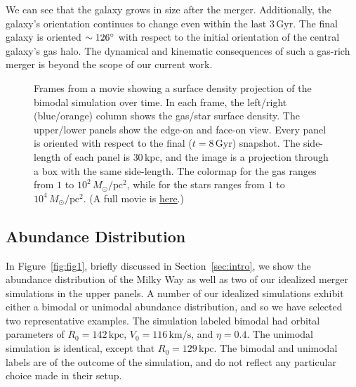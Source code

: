 \documentclass[twocolumn,linenumbers,trackchanges]{aastex631}
\newcommand{\Msun}{\ensuremath{M_{\odot}}}
\newcommand{\Gyr}{\ensuremath{\textrm{Gyr}}}
\newcommand{\kpc}{\ensuremath{\textrm{kpc}}}
\newcommand{\pc}{\ensuremath{\textrm{pc}}}
\newcommand{\kms}{\ensuremath{\textrm{km}/\textrm{s}}}
\begin{document}
We can see that the galaxy grows in size after the merger. Additionally, the galaxy's orientation continues to change even within the last $3\,\Gyr$. The final galaxy is oriented $\sim126\degree$ with respect to the initial orientation of the central galaxy's gas halo. The dynamical and kinematic consequences of such a gas-rich merger is beyond the scope of our current work.

\begin{figure*}
  \centering

  \caption{Frames from a movie showing a surface density projection of the bimodal simulation over time. In each frame, the left/right (blue/orange) column shows the gas/star surface density. The upper/lower panels show the edge-on and face-on view. Every panel is oriented with respect to the final ($t=8\,\Gyr$) snapshot. The side-length of each panel is $30\,\kpc$, and the image is a projection through a box with the same side-length. The colormap for the gas ranges from $1$ to $10^2\,\Msun/\pc^2$, while for the stars ranges from $1$ to $10^4\,\Msun/\pc^2$. (A full movie is \href{https://drive.google.com/file/d/1RKpFpnFIpl7XYAX5lvF7CyaPVO5dS3EO/view?usp=drive_link}{here}.)}
  \label{fig:projections}
\end{figure*}

\subsection{Abundance Distribution}\label{ssec:abundplane}
In Figure~\ref{fig:fig1}, briefly discussed in Section~\ref{sec:intro}, we show the abundance distribution of the Milky Way as well as two of our idealized merger simulations in the upper panels. A number of our idealized simulations exhibit either a bimodal or unimodal abundance distribution, and so we have selected two representative examples. The simulation labeled bimodal had orbital parameters of $R_0=142\,\kpc$, $V_0=116\,\kms$, and $\eta=0.4$. The unimodal simulation is identical, except that $R_0=129\,\kpc$. The bimodal and unimodal labels are of the outcome of the simulation, and do not reflect any particular choice made in their setup.
\end{document}
